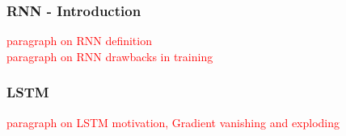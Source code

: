 \documentclass[12pt]{report}
\begin{document}
\subsubsection{RNN - Introduction}
\textcolor{red}{paragraph on RNN definition}\\

\textcolor{red}{paragraph on RNN drawbacks in training}\\






\newpage

\subsubsection{LSTM }



\textcolor{red}{paragraph on LSTM motivation, Gradient vanishing and exploding }\\

\end{document}
